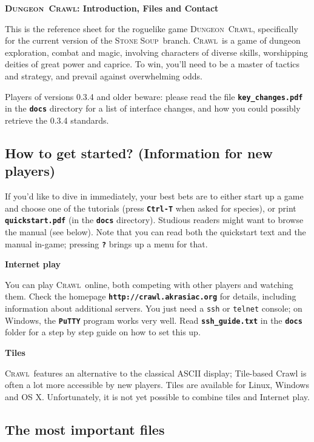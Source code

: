 \documentclass[a4paper,10pt]{article}
\newcommand{\key}[1]{{{\texttt{\textbf{#1}}}}} %
\newcommand{\sex}[1]{{{\textbf{#1}}}} %
\newcommand{\crawl}{\textsc{Crawl}}
\newcommand{\dungeon}{\textsc{Dungeon}}
\newcommand{\soup}{\textsc{Stone Soup}}
\newcommand{\para}{\vspace{1.5ex}}
\begin{document}
\begin{center}\textbf{\LARGE
\dungeon\ \crawl: Introduction, Files  and Contact
}\end{center}

This is the reference sheet for the roguelike game \dungeon\ \crawl,
specifically for the current version of the \soup\ branch. 
\crawl\ is a game of dungeon exploration, combat and magic, involving
characters of diverse skills, worshipping deities of great power and
caprice. To win, you'll need to be a master of tactics and strategy,
and prevail against overwhelming odds.

\para

Players of versions 0.3.4 and older beware: please read the file 
\key{key\_changes.pdf} in the \key{docs} directory for a list of
interface changes, and how you could possibly retrieve the 0.3.4
standards.

\subsection*{How to get started? (Information for new players)}

If you'd like to dive in immediately, your best bets are to either
start up a game and choose one of the tutorials (press \key{Ctrl-T} 
when asked for species), or print \key{quickstart.pdf} (in the 
\key{docs} directory). Studious readers might want to browse the manual
(see below). Note that you can read both the quickstart text and the
manual in-game; pressing \key{?} brings up a menu for that.

\para

\sex{Internet play}

You can play \crawl\ online, both competing with other players and watching 
them. Check the homepage \key{http://crawl.akrasiac.org} for details, including 
information about additional servers. You just need a \texttt{ssh} or 
\texttt{telnet} console; on Windows, the \key{PuTTY} program works very 
well. Read \key{ssh\_guide.txt} in the \key{docs} folder for a step by step 
guide on how to set this up.

\para 

\sex{Tiles}

\crawl\ features an alternative to the classical ASCII display; Tile-based
Crawl is often a lot more accessible by new players. Tiles are available for 
Linux, Windows and OS X.
Unfortunately, it is not yet possible to combine tiles and Internet play.

\subsection*{The most important files}
\end{document}
